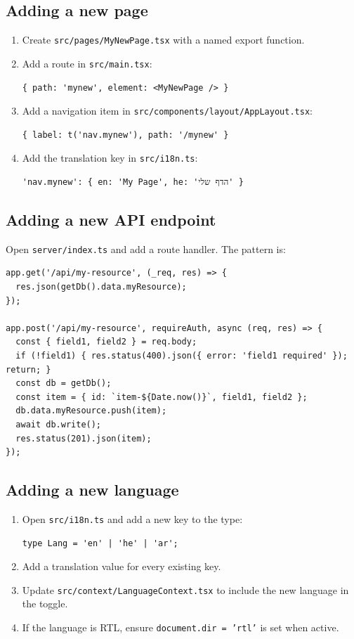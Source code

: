 \documentclass[12pt,a4paper]{article}
\begin{document}
\subsection{Adding a new page}

\begin{enumerate}
  \item Create \texttt{src/pages/MyNewPage.tsx} with a named export function.
  \item Add a route in \texttt{src/main.tsx}:
\begin{lstlisting}[language={}]
{ path: 'mynew', element: <MyNewPage /> }
\end{lstlisting}
  \item Add a navigation item in \texttt{src/components/layout/AppLayout.tsx}:
\begin{lstlisting}[language={}]
{ label: t('nav.mynew'), path: '/mynew' }
\end{lstlisting}
  \item Add the translation key in \texttt{src/i18n.ts}:
\begin{lstlisting}[language={}]
'nav.mynew': { en: 'My Page', he: 'הדף שלי' }
\end{lstlisting}
\end{enumerate}

\subsection{Adding a new API endpoint}

Open \texttt{server/index.ts} and add a route handler. The pattern is:

\begin{lstlisting}[language={}]
app.get('/api/my-resource', (_req, res) => {
  res.json(getDb().data.myResource);
});

app.post('/api/my-resource', requireAuth, async (req, res) => {
  const { field1, field2 } = req.body;
  if (!field1) { res.status(400).json({ error: 'field1 required' }); return; }
  const db = getDb();
  const item = { id: `item-${Date.now()}`, field1, field2 };
  db.data.myResource.push(item);
  await db.write();
  res.status(201).json(item);
});
\end{lstlisting}

\subsection{Adding a new language}

\begin{enumerate}
  \item Open \texttt{src/i18n.ts} and add a new key to the type:
\begin{lstlisting}[language={}]
type Lang = 'en' | 'he' | 'ar';
\end{lstlisting}
  \item Add a translation value for every existing key.
  \item Update \texttt{src/context/LanguageContext.tsx} to include the new language in the toggle.
  \item If the language is RTL, ensure \texttt{document.dir = 'rtl'} is set when active.
\end{enumerate}
\end{document}
